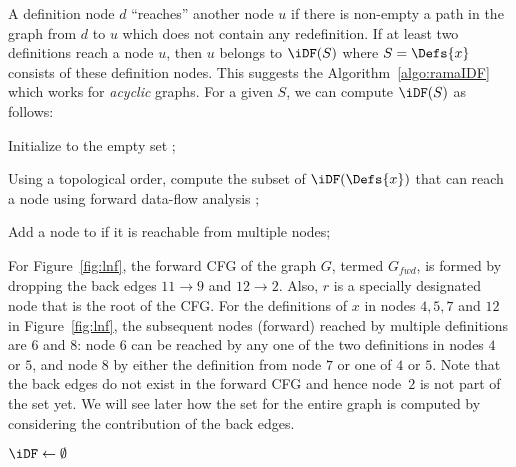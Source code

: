 {A definition node $d$ ``reaches'' another node $u$ if there is non-empty a path in the graph from $d$ to $u$ which does not contain any redefinition. 
If at least two definitions reach a node $u$, then $u$ belongs to $\iDF(S)$ where $S=\Defs{x}$ consists of these definition nodes. 
This suggests the Algorithm~\ref{algo:ramaIDF} which works for \emph{acyclic} graphs. 
For a given $S$, we can compute $\iDF(S)$ as follows:
\begin{itemize}
\item { Initialize \iDF to the empty set };
\item { Using a topological order, compute the subset of $\iDF(\Defs{x})$ that can reach a node using forward data-flow analysis };
{\item} {Add a node to \iDF if it is reachable from multiple nodes};
\end{itemize}  

For Figure~\ref{fig:lnf}, the forward CFG of the graph $G$, termed $G_{\textit{fwd}}$, is formed by dropping the back edges $11 \rightarrow 9$ and $12 \rightarrow 2$. 
Also, $r$ is a specially designated node that is the root of the CFG. 
For the definitions of $x$ in nodes $4,5,7$ and $12$ in Figure~\ref{fig:lnf}, the subsequent nodes (forward) reached by multiple definitions are $6$ and $8$:  node $6$ can be reached by any one of the two definitions in nodes $4$ or $5$, and node $8$ by either the definition from node $7$ or one of $4$ or $5$. 
Note that the back edges do not exist in the forward CFG and hence node~$2$ is not part of the \iDF set yet. 
We will see later how the \iDF set for the entire graph is computed by considering the contribution of the back edges.

\begin{algorithm}
  \caption{%
  Algorithm for \iDF in an acyclic graph.}
  \label{algo:ramaIDF}

  $\iDF \gets \emptyset$\;
  \Return{$\iDF$}   
\end{algorithm}

}
